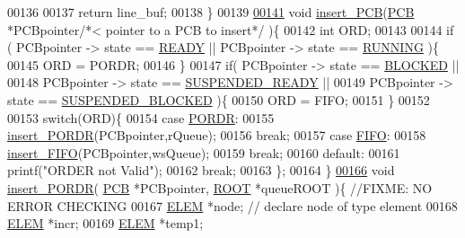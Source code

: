 \begin{DoxyCode}
{00136         
00137         \textcolor{keywordflow}{return} line\_buf;
00138 \}
00139 
\hypertarget{mpx__r2_8c_source_l00141}{}\hyperlink{mpx__r2_8h_aa3b334e3a5afd6e590917667ad359a6f}{00141} \textcolor{keywordtype}{void} \hyperlink{mpx__r2_8c_aa3b334e3a5afd6e590917667ad359a6f}{insert_PCB}(\hyperlink{structprocess}{PCB} *PCBpointer\textcolor{comment}{/*< pointer to a PCB to insert*/} )\{ 
00142    \textcolor{keywordtype}{int} ORD;
00143   
00144    \textcolor{keywordflow}{if} ( PCBpointer -> state == \hyperlink{mpx__r2_8h_ad1235d5ce36f7267285e82dccd428aa6}{READY} || PCBpointer -> state == \hyperlink{mpx__r2_8h_a6fb7181d994ee98e735494be55809708}{RUNNING} )\{
00145                 ORD  = PORDR;
00146         \}
00147         \textcolor{keywordflow}{if}( PCBpointer -> state == \hyperlink{mpx__r2_8h_a48f6457243719e7031768d4100741159}{BLOCKED} || 
00148                 PCBpointer -> state == \hyperlink{mpx__r2_8h_a07b1141143e8825b04670da23fca8cc7}{SUSPENDED_READY} || 
00149                 PCBpointer -> state == \hyperlink{mpx__r2_8h_a6e41bb5a80c5049e8d364bab8ee4d73a}{SUSPENDED_BLOCKED} )\{
00150                 ORD  = FIFO;
00151         \}
00152         
00153    \textcolor{keywordflow}{switch}(ORD)\{
00154                 \textcolor{keywordflow}{case} \hyperlink{mpx__r2_8h_ace032edafb5fe32666cf53a1e7a957e0}{PORDR}:
00155                         \hyperlink{mpx__r2_8c_a722f27bfb24e46ffd7eb86fb34024ed9}{insert_PORDR}(PCBpointer,rQueue);
00156                         \textcolor{keywordflow}{break};
00157                 \textcolor{keywordflow}{case} \hyperlink{mpx__r2_8h_af6bc2702f6a1a4bb063b0726d90999da}{FIFO}:
00158                         \hyperlink{mpx__r2_8c_a58a3e3525ed6385f632835b55ab7d7d1}{insert_FIFO}(PCBpointer,wsQueue);
00159                         \textcolor{keywordflow}{break};
00160                 \textcolor{keywordflow}{default}:
00161                         printf(\textcolor{stringliteral}{"ORDER not Valid"});
00162                         \textcolor{keywordflow}{break};
00163                 \};
00164 \}
\hypertarget{mpx__r2_8c_source_l00166}{}\hyperlink{mpx__r2_8h_a9a582eea14fd6628937fb0891220fa82}{00166} \textcolor{keywordtype}{void} \hyperlink{mpx__r2_8c_a722f27bfb24e46ffd7eb86fb34024ed9}{insert_PORDR}( \hyperlink{structprocess}{PCB} *PCBpointer, \hyperlink{structroot}{ROOT} *queueROOT )\{ \textcolor{comment}{//FIXME: NO ERROR CHECKING
      }
00167         \hyperlink{structpage}{ELEM} *node; \textcolor{comment}{// declare node of type element}
00168         \hyperlink{structpage}{ELEM} *incr;
00169         \hyperlink{structpage}{ELEM} *temp1;
}
\end{DoxyCode}
